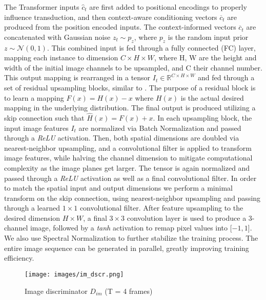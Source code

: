 \documentclass{article}
\begin{document}
The Transformer inputs $\hat{c}_t$ are first added to positional encodings to properly influence transduction, and then context-aware conditioning vectors $\overline{c}_t$ are produced from the position encoded inputs. The context-informed vectors $\overline{c}_t$ are concatenated with Gaussian noise $z_t\sim p_z$, where $p_z$ is the random input prior $z\sim\mathcal{N}(0,1)$. This combined input is fed through a fully connected (FC) layer, mapping each instance to dimension $C\times H\times W$, where H, W are the height and width of the initial image channels to be upsampled, and C their channel number. This output mapping is rearranged in a tensor $I_t\in\mathbb{R}^ {C\times H\times W}$ and fed through a set of residual upsampling blocks, similar to \cite{zhang2019sagan}. The purpose of a residual block \cite{he2016resnet} is to learn a mapping $F(x)=H(x)-x$ where $H(x)$ is the actual desired mapping in the underlying distribution. The final output is produced utilizing a skip connection such that $\hat{H}(x) = F(x)+x$. 
In each upsampling block, the input image features \textbf{$I_t$} are normalized via Batch Normalization \cite{ioffe2015batchnorm} and passed
through a \textit{ReLU} activation. Then, both spatial dimensions are doubled via nearest-neighbor upsampling,
and a convolutional filter is applied to transform image features, while halving the channel dimension to mitigate computational complexity as the image planes get larger. The tensor is again normalized and passed
through a \textit{ReLU} activation as well as a final convolutional filter. In order to match the spatial input and output dimensions we perform a minimal transform on the skip connection, using
nearest-neighbor upsampling and passing through a learned $1 \times 1$ convolutional filter.
After feature upsampling to the desired dimension $H \times W$, a final $3 \times 3$ convolution layer is used to
produce a 3-channel image, followed by a \textit{tanh} activation to remap pixel values into
[$-1, 1$]. We also use Spectral Normalization to further stabilize the training process. The entire image sequence can be generated in parallel, greatly improving training efficiency. 

\begin{figure}[t]
\hspace{-0.2cm}
\texttt{[image: images/im\_dscr.png]}
\caption{Image discriminator $D_{im}$ (T = 4 frames)}
\vspace{-0.2cm}
\label{fig:im_dscr}
\end{figure}
\end{document}

